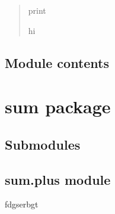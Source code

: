 \documentclass[letterpaper,10pt,english]{sphinxmanual}
\begin{document}

\begin{fulllineitems}
\label{\detokenize{function:function.main.print_hi}}
\pysigstartsignatures
{}
\pysigstopsignatures\begin{description}
\begin{quote}\begin{description}
\sphinxAtStartPar
print

\sphinxAtStartPar
hi

\end{description}\end{quote}

\end{description}

\end{fulllineitems}



\subsection{Module contents}
\label{\detokenize{function:module-function}}\label{\detokenize{function:module-contents}}
\sphinxstepscope


\section{sum package}
\label{\detokenize{sum:sum-package}}\label{\detokenize{sum::doc}}

\subsection{Submodules}
\label{\detokenize{sum:submodules}}

\subsection{sum.plus module}
\label{\detokenize{sum:module-sum.plus}}\label{\detokenize{sum:sum-plus-module}}
\sphinxAtStartPar
fdgserbgt
\end{document}
